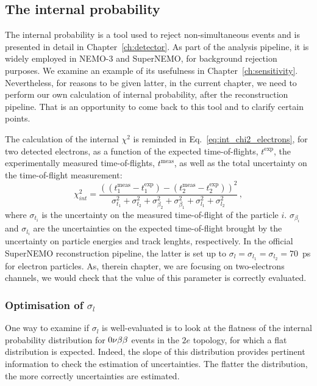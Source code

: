 \subsection{The internal probability}

The internal probability is a tool used to reject non-simultaneous events and is presented in detail in Chapter~\ref{ch:detector}.
As part of the analysis pipeline, it is widely employed in NEMO-$3$ and SuperNEMO, for background rejection purposes.
We examine an example of its usefulness in Chapter~\ref{ch:sensitivity}.
Nevertheless, for reasons to be given latter, in the current chapter, we need to perform our own calculation of internal probability, after the reconstruction pipeline.
That is an opportunity to come back to this tool and to clarify certain points.

The calculation of the internal $\chi^{2}$ is reminded in Eq.~\eqref{eq:int_chi2_electrons}, for two detected electrons, as a function of the expected time-of-flights, $t^{\text{exp}}$, the experimentally measured time-of-flights, $t^{\text{meas}}$, as well as the total uncertainty on the time-of-flight measurement:
\begin{equation}
  \chi^{2}_{int}=\frac{((t^{\text{meas}}_{1} - t^{\text{exp}}_{1}) - (t^{\text{meas}}_{2} - t^{\text{exp}}_{2}))^{2}}{\sigma_{t_{1}}^{2}+\sigma_{t_{2}}^{2}+\sigma_{\beta_{2}}^{2}+\sigma_{\beta_{1}}^{2}+\sigma_{l_{1}}^{2}+\sigma_{l_{2}}^{2}}\,,
  \label{eq:int_chi2_electrons}
\end{equation}
where $\sigma_{t_{i}}$ is the uncertainty on the measured time-of-flight of the particle $i$.
$\sigma_{\beta_{i}}$ and $\sigma_{l_{i}}$ are the uncertainties on the expected time-of-flight brought by the uncertainty on particle energies and track lenghts, respectively.
In the official SuperNEMO reconstruction pipeline, the latter is set up to ${\sigma_{l}=\sigma_{l_{1}}=\sigma_{l_{2}}=70}$~ps for electron particles.
As, therein chapter, we are focusing on two-electrons channels, we would check that the value of this parameter is correctly evaluated.

\subsubsection*{Optimisation of $\sigma_{l}$}

One way to examine if $\sigma_{l}$ is well-evaluated is to look at the flatness of the internal probability distribution for $0\nu\beta\beta$ events in the $2e$ topology, for which a flat distribution is expected.
Indeed, the slope of this distribution provides pertinent information to check the estimation of uncertainties.
The flatter the distribution, the more correctly uncertainties are estimated.


